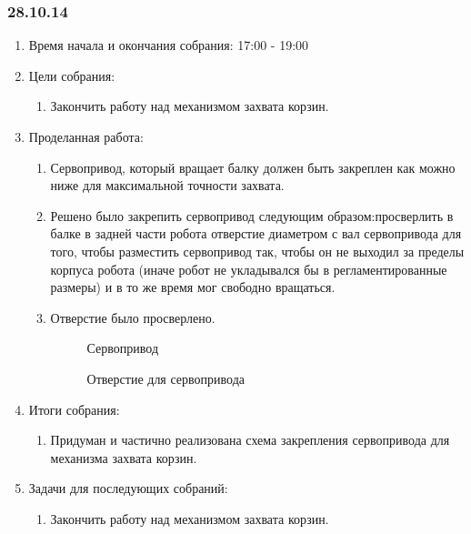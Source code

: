 
\subsubsection{28.10.14}

\begin{enumerate}
	\item Время начала и окончания собрания:
	17:00 - 19:00
	\item Цели собрания:
	\begin{enumerate}
	  \item Закончить работу над механизмом захвата корзин.
	  
    \end{enumerate}
    
	\item Проделанная работа:
	\begin{enumerate}
	  \item Сервопривод, который вращает балку должен быть закреплен как можно ниже для максимальной точности захвата.
      
      \item Решено было закрепить сервопривод следующим образом:просверлить в балке в задней части робота отверстие диаметром с вал сервопривода для того, чтобы разместить сервопривод так, чтобы он не выходил за пределы корпуса робота (иначе робот не укладывался бы в регламентированные размеры) и в то же время мог свободно вращаться.
      
      \item Отверстие было просверлено.
      
      \begin{figure}[H]
      	\begin{minipage}[h]{0.47\linewidth}
      		\caption{Сервопривод}
      	\end{minipage}
      	\hfill
      	\begin{minipage}[h]{0.47\linewidth}
      		\caption{Отверстие для сервопривода}
      	\end{minipage}
      \end{figure}
      
    \end{enumerate}
    
	\item Итоги собрания: 
	\begin{enumerate}
	  \item Придуман и частично реализована схема закрепления сервопривода для механизма захвата корзин.
	  
    \end{enumerate}
    
	\item Задачи для последующих собраний:
	\begin{enumerate}
	  \item Закончить работу над механизмом захвата корзин.
	  
    \end{enumerate}     
\end{enumerate}

\fillpage
